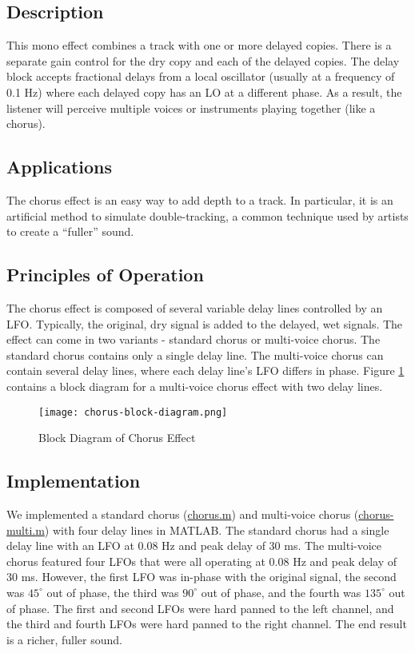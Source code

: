 \subsection{Description}
This mono effect combines a track with one or more delayed copies. There is a separate gain control for the dry copy and each of the delayed copies. The delay block accepts fractional delays from a local oscillator (usually at a frequency of 0.1 Hz) where each delayed copy has an LO at a different phase. As a result, the listener will perceive multiple voices or instruments playing together (like a chorus).

\subsection{Applications}
The chorus effect is an easy way to add depth to a track. In particular, it is an artificial method to simulate double-tracking, a common technique used by artists to create a ``fuller'' sound.

\subsection{Principles of Operation}
The chorus effect is composed of several variable delay lines controlled by an LFO. Typically, the original, dry signal is added to the delayed, wet signals. The effect can come in two variants - standard chorus or multi-voice chorus. The standard chorus contains only a single delay line. The multi-voice chorus can contain several delay lines, where each delay line's LFO differs in phase. Figure \ref{fig:chorus-block-diagram} contains a block diagram for a multi-voice chorus effect with two delay lines.
\begin{figure}[ht]
    \centering
    \texttt{[image: chorus-block-diagram.png]}
    \caption{Block Diagram of Chorus Effect}
    \label{fig:chorus-block-diagram}
\end{figure}

\subsection{Implementation}
We implemented a standard chorus (\href{run:../chorus.m}{chorus.m}) and multi-voice chorus (\href{run:../chorus-multi.m}{chorus-multi.m}) with four delay lines in MATLAB. The standard chorus had a single delay line with an LFO at 0.08 Hz and peak delay of 30 ms. The multi-voice chorus featured four LFOs that were all operating at 0.08 Hz and peak delay of 30 ms. However, the first LFO was in-phase with the original signal, the second was $45^\circ$ out of phase, the third was $90^\circ$ out of phase, and the fourth was $135^\circ$ out of phase. The first and second LFOs were hard panned to the left channel, and the third and fourth LFOs were hard panned to the right channel. The end result is a richer, fuller sound.

